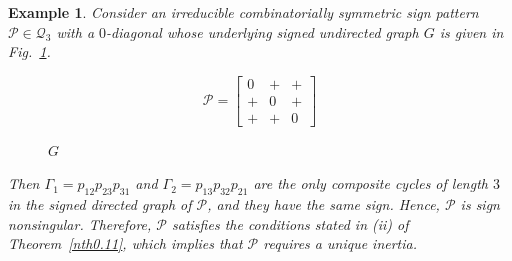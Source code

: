 \documentclass[a4paper, 10pt]{article}
\newtheorem{eg}{Example}[section]
\numberwithin{equation}{section}
\begin{document}
\begin{eg}
	Consider an irreducible combinatorially symmetric sign pattern $\mathcal{P}\in \mathcal{Q}_3$ with a $0$-diagonal whose underlying signed undirected graph $G$ is given in Fig.~\ref{xx2}.
	\begin{figure}[H]
		\centering
		\begin{minipage}{.45\textwidth}
			\vspace{-1cm}
			\[
			\mathcal{P}=
			\begin{bmatrix}
				0 & + & + \\
				+ & 0 & + \\
				+ & + & 0
			\end{bmatrix}
			\]
		\end{minipage}
		\hspace{0.05\textwidth}
		\begin{minipage}{.45\textwidth}
			\centering
			\tikzset{node distance=1cm}
			\caption{$G$}
			\label{xx2}
		\end{minipage}
	\end{figure}
	
	Then $\Gamma_1 = p_{12}p_{23}p_{31}$ and $\Gamma_2 = p_{13}p_{32}p_{21}$ are the only composite cycles of length $3$ in the signed directed graph of $\mathcal{P}$, and they have the same sign. Hence, $\mathcal{P}$ is sign nonsingular. Therefore, $\mathcal{P}$ satisfies the conditions stated in (ii) of Theorem~\ref{nth0.11}, which implies that $\mathcal{P}$ requires a unique inertia.
\end{eg}
\end{document}
